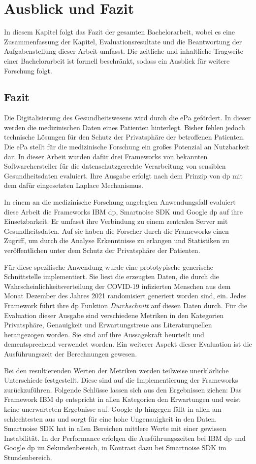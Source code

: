 \chapter{Ausblick und Fazit}
In diesem Kapitel folgt das Fazit der gesamten Bachelorarbeit, wobei es eine Zusammenfassung der Kapitel, Evaluationsresultate und die Beantwortung der Aufgabenstellung dieser Arbeit umfasst. Die zeitliche und inhaltliche Tragweite einer Bachelorarbeit ist formell beschränkt, sodass ein Ausblick für weitere Forschung folgt. 
\section{Fazit}
Die Digitalisierung des Gesundheitswesens wird durch die \gls{ePa} gefördert. In dieser werden die medizinischen Daten eines Patienten hinterlegt. Bisher fehlen jedoch technische Lösungen für den Schutz der Privatsphäre der betroffenen Patienten. Die \gls{ePa} stellt für die medizinische Forschung ein großes Potenzial an Nutzbarkeit dar. In dieser Arbeit wurden dafür drei Frameworks von bekannten Softwarehersteller für die datenschutzgerechte Verarbeitung von sensiblen Gesundheitsdaten evaluiert. Ihre Ausgabe erfolgt nach dem Prinzip von \gls{dp} mit dem dafür eingesetzten Laplace Mechanismus. 

In einem an die medizinische Forschung angelegten Anwendungsfall evaluiert diese Arbeit die Frameworks IBM \gls{dp}, Smartnoise SDK und Google \gls{dp} auf ihre Einsetzbarkeit. Er umfasst ihre Verbindung zu einem zentralen Server mit Gesundheitsdaten. Auf sie haben die Forscher durch die Frameworks einen Zugriff, um durch die Analyse Erkenntnisse zu erlangen und Statistiken zu veröffentlichen unter dem Schutz der Privatsphäre der Patienten.

Für diese spezifische Anwendung wurde eine prototypische generische Schnittstelle implementiert. Sie liest die erzeugten Daten, die durch die Wahrscheinlichkeitsverteilung der COVID-19 infizierten Menschen aus dem Monat Dezember des Jahres 2021 randomisiert generiert worden sind, ein. Jedes Framework führt ihre \gls{dp} Funktion \textit{Durchschnitt} auf diesen Daten durch. Für die Evaluation dieser Ausgabe sind verschiedene Metriken in den Kategorien Privatsphäre, Genauigkeit und Erwartungstreue aus Literaturquellen herangezogen worden. Sie sind auf ihre Aussagekraft beurteilt und dementsprechend verwendet worden. Ein weiterer Aspekt dieser Evaluation ist die Ausführungszeit der Berechnungen gewesen.

Bei den resultierenden Werten der Metriken werden teilweise unerklärliche Unterschiede festgestellt. Diese sind auf die Implementierung der Frameworks zurückzuführen. Folgende Schlüsse lassen sich aus den Ergebnissen ziehen:
Das Framework IBM \gls{dp} entspricht in allen Kategorien den Erwartungen und weist keine unerwarteten Ergebnisse auf. Google \gls{dp} hingegen fällt in allen am schlechtesten aus und sorgt für eine hohe Ungenauigkeit in den Daten. Smartnoise SDK hat in allen Bereichen mittlere Werte mit einer gewissen Instabilität. In der Performance erfolgen die Ausführungszeiten bei IBM \gls{dp} und Google \gls{dp} im Sekundenbereich, in Kontrast dazu bei Smartnoise SDK im Stundenbereich.

